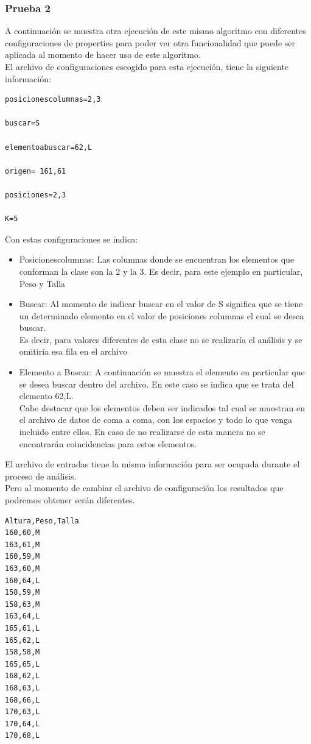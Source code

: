 \subsubsection{Prueba 2}
A continuación se muestra otra ejecución de este mismo algoritmo con diferentes configuraciones de properties para poder ver otra funcionalidad que puede ser aplicada al momento de hacer uso de este algoritmo. \\
El archivo de configuraciones escogido para esta ejecución, tiene la siguiente información:
\\
\begin{verbatim}
posicionescolumnas=2,3

buscar=S

elementoabuscar=62,L

origen= 161,61

posiciones=2,3

K=5
\end{verbatim}
Con estas configuraciones se indica:
\begin{itemize}
	\item Posicionescolumnas: Las columnas donde se encuentran los elementos que conforman la clase son la 2 y la 3. Es decir, para este ejemplo en particular, Peso y Talla
	\\
	\item Buscar: Al momento de indicar buscar en el valor de S significa que se tiene un determinado elemento en el valor de posiciones columnas el cual se desea buscar.\\
	Es decir, para valores diferentes de esta clase no se realizaría el análisis y se omitiría esa fila en el archivo 
	\item Elemento a Buscar: A continuación se muestra el elemento en particular que se desea buscar dentro del archivo. En este caso se indica que se trata del elemento 62,L.\\
	Cabe destacar que los elementos deben ser indicados tal cual se muestran en el archivo de datos de coma a coma, con los espacios y todo lo que venga incluido entre ellos. En caso de no realizarse de esta manera no se encontrarán coincidencias para estos elementos.
\end{itemize}
El archivo de entradas tiene la misma información para ser ocupada durante el proceso de análisis.
\\
Pero al momento de cambiar el archivo de configuración los resultados que podremos obtener serán diferentes.\\
\begin{verbatim}
Altura,Peso,Talla
160,60,M
163,61,M
160,59,M
163,60,M
160,64,L
158,59,M
158,63,M
163,64,L
165,61,L
165,62,L
158,58,M
165,65,L
168,62,L
168,63,L
168,66,L
170,63,L 
170,64,L 
170,68,L 
\end{verbatim}
